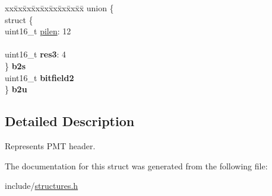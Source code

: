 \begin{DoxyCompactItemize}
\begin{tabbing}
\end{tabbing}\item 
\begin{tabbing}
xx\=xx\=xx\=xx\=xx\=xx\=xx\=xx\=xx\=\kill
union \{\\
\>struct \{\\
\>\>uint16\_t \hyperlink{structpmt__header_a365f4b386853bdd2f96459a36acf90b0}{pilen}: 12\\
\>\>\\
\>\>uint16\_t {\bfseries res3}: 4\\
\>\} {\bfseries b2s}\\
\>uint16\_t {\bfseries bitfield2}\\
\} {\bfseries b2u}\hypertarget{structpmt__header_a1be8b71e69b4723855acc265732a87a3}{}\label{structpmt__header_a1be8b71e69b4723855acc265732a87a3}
\\

\end{tabbing}\end{DoxyCompactItemize}


\subsection{Detailed Description}
Represents P\+MT header. 

The documentation for this struct was generated from the following file\+:\begin{DoxyCompactItemize}
\item 
include/\hyperlink{structures_8h}{structures.\+h}\end{DoxyCompactItemize}
